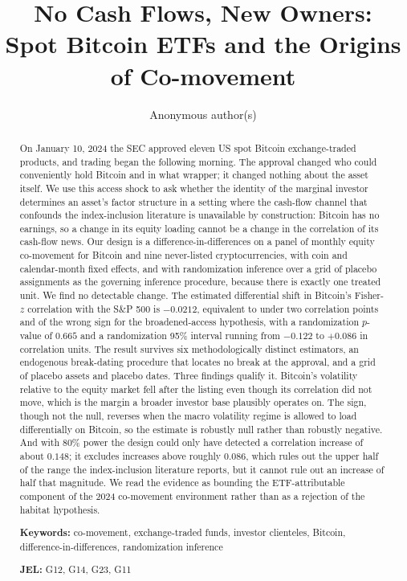 \documentclass[12pt,a4paper]{article}
\title{No Cash Flows, New Owners:\\ Spot Bitcoin ETFs and the Origins of Co-movement}
\author{Anonymous author(s)}
\date{}
\begin{document}
\maketitle

\begin{abstract}
\noindent On January 10, 2024 the SEC approved eleven US spot Bitcoin exchange-traded products, and trading began the following morning. The approval changed who could conveniently hold Bitcoin and in what wrapper; it changed nothing about the asset itself. We use this access shock to ask whether the identity of the marginal investor determines an asset's factor structure in a setting where the cash-flow channel that confounds the index-inclusion literature is unavailable by construction: Bitcoin has no earnings, so a change in its equity loading cannot be a change in the correlation of its cash-flow news. Our design is a difference-in-differences on a panel of monthly equity co-movement for Bitcoin and nine never-listed cryptocurrencies, with coin and calendar-month fixed effects, and with randomization inference over a grid of placebo assignments as the governing inference procedure, because there is exactly one treated unit. We find no detectable change. The estimated differential shift in Bitcoin's Fisher-$z$ correlation with the S\&P 500 is
$-0.0212$, equivalent to under two correlation points and of the wrong sign for the broadened-access hypothesis, with a randomization $p$-value of
$0.665$ and a randomization 95\% interval running from
$-0.122$ to $+0.086$ in correlation units. The result survives six methodologically distinct estimators, an endogenous break-dating procedure that locates no break at the approval, and a grid of placebo assets and placebo dates. Three findings qualify it. Bitcoin's volatility relative to the equity market fell after the listing even though its correlation did not move, which is the margin a broader investor base plausibly operates on. The sign, though not the null, reverses when the macro volatility regime is allowed to load differentially on Bitcoin, so the estimate is robustly null rather than robustly negative. And with 80\% power the design could only have detected a correlation increase of about
$0.148$; it excludes increases above roughly $0.086$, which rules out the upper half of the range the index-inclusion literature reports, but it cannot rule out an increase of half that magnitude. We read the evidence as bounding the ETF-attributable component of the 2024 co-movement environment rather than as a rejection of the habitat hypothesis.

\bigskip
\noindent\textbf{Keywords:} co-movement, exchange-traded funds, investor clienteles, Bitcoin, difference-in-differences, randomization inference

\noindent\textbf{JEL:} G12, G14, G23, G11
\end{abstract}
\end{document}

